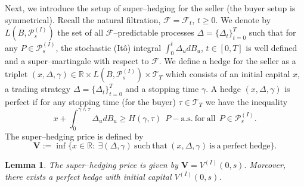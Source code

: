 \documentclass{amsart}
\newtheorem{lem}[thm]{Lemma}
\numberwithin{equation}{section}
\begin{document}
Next, we introduce the setup of super--hedging for the seller (the buyer setup is symmetrical).
Recall the natural filtration, $\mathcal F=\mathcal F_t$, $t\geq 0$. We denote by
 $L(B,\mathcal P^{(I)}_s)$ the set of all $\mathcal F$--predictable processes $\Delta=\{\Delta_t\}_{t=0}^T$
 such that for any $P\in\mathcal P^{(I)}_s$, the stochastic (It\^{o}) integral $\int_{0}^t \Delta_u dB_u$, $t\in [0,T]$ is well defined and a super--martingale
with respect to $\mathcal F$.
We define a hedge for the seller as a triplet $(x,\Delta,\gamma)\in \mathbb R\times L(B,\mathcal P^{(I)}_s)\times\mathcal T_T$ which consists of
an initial capital $x$, a trading strategy
$\Delta=\{\Delta_t\}_{t=0}^T$ and a stopping time $\gamma$. A hedge
$(x,\Delta,\gamma)$ is perfect if for any stopping time (for the buyer) $\tau\in\mathcal T_T$ we have the inequality
$$x+\int_{0}^{\gamma\wedge\tau} \Delta_u dB_u\geq H(\gamma,\tau) \ \ P-\mbox{a.s.} \ \mbox{for} \ \mbox{all} \ \ P\in\mathcal P^{(I)}_s.$$
The super--hedging price is defined by
$$\mathbf V:=\inf\{x\in\mathbb R: \ \exists (\Delta,\gamma) \ \mbox{such} \ \mbox{that} \ (x,\Delta,\gamma) \ \mbox{is}
\ \mbox{a} \ \mbox{perfect} \ \mbox{hedge}\}. $$
\begin{lem}\label{lem6.1}
The super--hedging price is given by
$\mathbf V=V^{(I)}(0,s).$ Moreover, there exists a perfect hedge with initial capital $V^{(I)}(0,s)$.
\end{lem}
\end{document}
